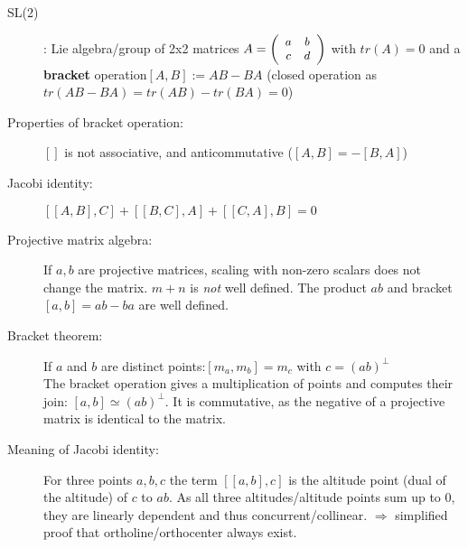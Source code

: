 \documentclass[DIV16,halfparskip]{scrartcl}
\begin{document}
\begin{description}
    \item[SL(2)]: Lie algebra/group of 2x2 matrices
    $A=\small\left(\begin{array}{cc}a&b\\c&d\end{array}\right)$ with $tr(A) = 0$ and a
    \textbf{bracket} operation\linebreak $[A,B]:= AB-BA$ (closed operation as
    $tr(AB-BA) = tr(AB)-tr(BA) = 0$)

    \item[Properties of bracket operation:] $[]$ is not associative, and
        anticommutative ($[A,B] = -[B,A]$)

    \item[Jacobi identity:] $[[A,B],C] + [[B,C],A] + [[C,A],B] = 0$

    \item[Projective matrix algebra:] If $a,b$ are projective matrices, scaling
        with non-zero scalars does not change the matrix. $m+n$ is
        \emph{not} well defined. The product $ab$ and bracket $[a,b] = ab-ba$
        are well defined.

    \item[Bracket theorem:] If $a$ and $b$ are distinct points:$[m_a,m_b] =
        m_c$ with $c=(ab)^\perp$\\
        The bracket operation gives a multiplication of points and computes
        their join: $[a,b] \simeq (ab)^\perp$. It is commutative, as the
        negative of a projective matrix is identical to the matrix.

    \item [Meaning of Jacobi identity:] For three points $a, b, c$ the term
        $[[a,b],c]$ is the altitude point (dual of the altitude) of $c$ to
        $ab$. As all three altitudes/altitude points sum up to 0, they are linearly
        dependent and thus concurrent/collinear. $\Rightarrow$ simplified proof
        that ortholine/orthocenter always exist.
\end{description}
\end{document}
